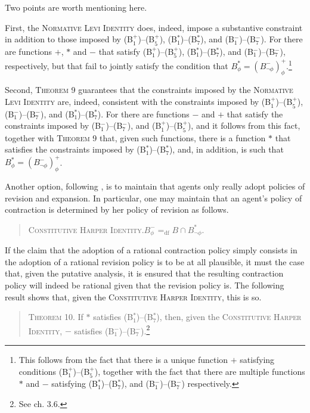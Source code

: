 Two points are worth mentioning here.

First, the \textsc{Normative Levi Identity} does, indeed, impose a substantive constraint in addition to those imposed by (B$^+_1$)--(B$^+_5$), (B$^*_1$)--(B$^*_7$), and (B$^-_1$)--(B$^-_7$).
For there are functions $+$, $*$ and $-$ that satisfy (B$^+_1$)--(B$^+_5$), (B$^*_1$)--(B$^*_7$), and (B$^-_1$)--(B$^-_7$), respectively, but that fail to jointly satisfy the condition that $B^*_\phi = (B^-_{\lnot \phi})^+_\phi$.\footnote{This follows from the fact that there is a unique function $+$ satisfying conditions (B$^+_1$)--(B$^+_5$), together with the fact that there are multiple functions $*$ and $-$ satisfying (B$^*_1$)--(B$^*_7$), and (B$^-_1$)--(B$^-_7$) respectively.}

Second, \textsc{Theorem 9} guarantees that the constraints imposed by the \textsc{Normative Levi Identity} are, indeed, consistent with the constraints imposed by (B$^+_1$)--(B$^+_5$), (B$^-_1$)--(B$^-_7$), and (B$^*_1$)--(B$^*_7$).
For there are functions $-$ and $+$ that satisfy the constraints imposed by (B$^-_1$)--(B$^-_7$), and  (B$^+_1$)--(B$^+_5$), and it follows from this fact, together with \textsc{Theorem 9} that, given such functions, there is a function $*$ that satisfies the constraints imposed by (B$^*_1$)--(B$^*_7$), and, in addition, is such that $B^*_\phi = (B^-_{\lnot \phi})^+_\phi$.

Another option, following \citet{Harper1}, is to maintain that agents only really adopt policies of revision and expansion.
In particular, one may maintain that an agent's policy of contraction is determined by her policy of revision as follows.
\begin{quote}
\textsc{Constitutive Harper Identity.}\quad $B^-_\phi =_{\text{df}} B \cap B^*_{\lnot \phi}$.
\end{quote}

If the claim that the adoption of a rational contraction policy simply consists in the adoption of a rational revision policy is to be at all plausible, it must the case that, given the putative analysis, it is ensured that the resulting contraction policy will indeed be rational given that the revision policy is.
The following result shows that, given the \textsc{Constitutive Harper Identity}, this is so.
\begin{quote}
\textsc{Theorem 10.}\; If $*$ satisfies (B$^*_1$)--(B$^*_7$), then, given the \textsc{Constitutive Harper Identity}, $-$ satisfies (B$^-_1$)--(B$^-_7$).\footnote{See \citet{Gardenfors1} ch. 3.6.}
\end{quote}


